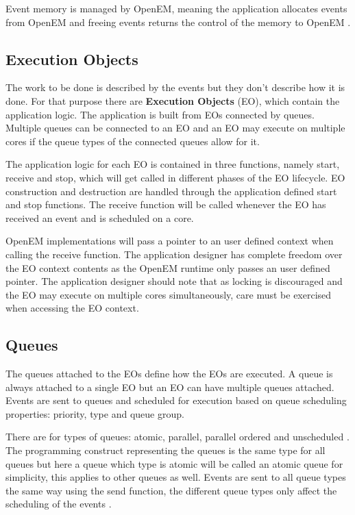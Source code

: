 Event memory is managed by OpenEM, meaning the application allocates events
from OpenEM and freeing events returns the control of the memory to OpenEM
\cite{openemintro}.
\subsection{Execution Objects}
\label{subsec:eos}
The work to be done is described by the events but they don't describe how it
is done. For that purpose there are \textbf{Execution Objects} (EO), which
contain the application logic. The application is built from EOs connected by
queues.  Multiple queues can be connected to an EO and an EO may execute on
multiple cores if the queue types of the connected queues allow for it.
\cite{openemintro}

The application logic for each EO is contained in three functions, namely
start, receive and stop, which will get called in different phases of the EO
lifecycle. EO construction and destruction are handled through the application
defined start and stop functions. The receive function will be called whenever
the EO has received an event and is scheduled on a core. \cite{openemintro}

OpenEM implementations will pass a pointer to an user defined context when
calling the receive function. The application designer has complete freedom
over the EO context contents as the OpenEM runtime only passes an user defined
pointer. \cite{openemintro} The application designer should note that as
locking is discouraged and the EO may execute on multiple cores simultaneously,
care must be exercised when accessing the EO context.

\subsection{Queues}
\label{subsec:queues}
The queues attached to the EOs define how the EOs are executed. A queue is
always attached to a single EO but an EO can have multiple queues attached.
Events are sent to queues and scheduled for execution based on queue scheduling
properties: priority, type and queue group. \cite{openemintro}

There are for types of queues: atomic, parallel, parallel ordered and
unscheduled \cite{openemintro}. The programming construct representing the
queues is the same type for all queues but here a queue which type is atomic
will be called an atomic queue for simplicity, this applies to other queues as
well. Events are sent to all queue types the same way using the send function,
the different queue types only affect the scheduling of the events
\cite{openemintro}.

